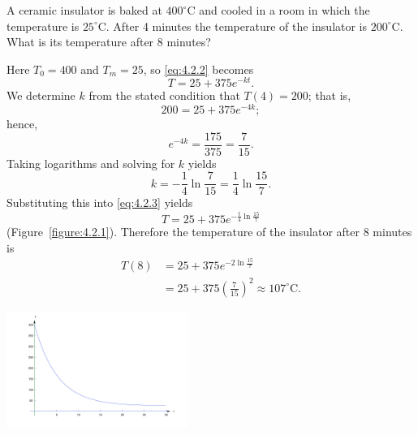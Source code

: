 \documentclass{ximera}
\begin{document}
\begin{example}\label{example:4.2.1}
A ceramic insulator is baked at $400^\circ$C and cooled in a room in
which the temperature is $25^\circ$C. After 4 minutes the
temperature of the insulator is $200^\circ$C. What is its temperature
after 8 minutes?
\begin{explanation} Here $T_0=400$ and $T_m=25$, so \eqref{eq:4.2.2} becomes
\begin{equation} \label{eq:4.2.3}
T=25+375e^{-kt}.
\end{equation}
 We determine $k$ from the stated condition that  $T(4)=200$;
that is,
$$
200=25+375e^{-4k};
$$
 hence,
$$
e^{-4k} = \frac{175}{375} = \frac{7}{15}.
$$
 Taking logarithms and solving for $k$ yields
$$
k=-\frac{1}{4} \ln \frac{7}{15}=\frac{1}{4}\ln \frac{15}{7}.
$$
 Substituting this into \eqref{eq:4.2.3} yields
$$
T=25+375 e^{-\frac{t}{4} \ln \frac{15}{7}}
$$
(Figure~\ref{figure:4.2.1}).
Therefore the temperature of the insulator after
8 minutes is
$$\begin{array}{rl}
T(8) & = 25+375 e^{-2 \ln \frac{15}{7}} \\
& = 25+375 \left(\frac{7}{15}\right)^2 \approx
107^\circ \mbox{C}.
\end{array}$$

\begin{image}
  \includegraphics[height=1.5in]{fig040201.jpg} \end{image}
\end{explanation}
\end{example}
\end{document}
